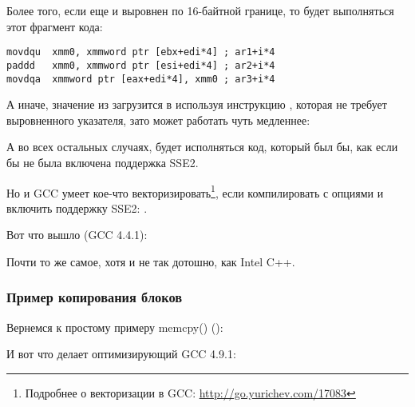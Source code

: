 Более того, если еще и  выровнен по 16-байтной границе, 
то будет выполняться этот фрагмент кода:

\begin{lstlisting}
movdqu  xmm0, xmmword ptr [ebx+edi*4] ; ar1+i*4
paddd   xmm0, xmmword ptr [esi+edi*4] ; ar2+i*4
movdqa  xmmword ptr [eax+edi*4], xmm0 ; ar3+i*4
\end{lstlisting}

А иначе, значение из  загрузится в  используя инструкцию \MOVDQU, 
которая не требует выровненного указателя, зато может работать чуть медленнее:



А во всех остальных случаях, будет исполняться код, который был бы, как если бы не была 
включена поддержка SSE2.


\newcommand{\URLGCCVEC}{\url{http://go.yurichev.com/17083}}

Но и GCC умеет кое-что векторизировать\footnote{Подробнее о векторизации в GCC: \URLGCCVEC}, 
если компилировать с опциями \Othree и включить поддержку SSE2: .

Вот что вышло (GCC 4.4.1):



Почти то же самое, хотя и не так дотошно, как Intel C++.

\subsubsection{Пример копирования блоков}
\label{vec_memcpy}

Вернемся к простому примеру memcpy() ():



И вот что делает оптимизирующий GCC 4.9.1:


